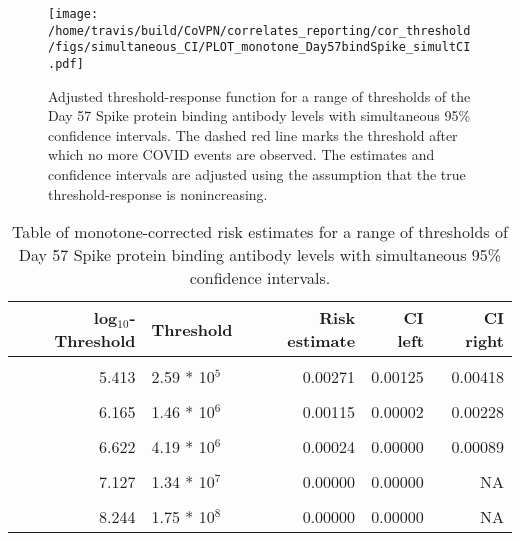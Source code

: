 \documentclass[]{book}
\theoremstyle{definition}
\theoremstyle{definition}
\theoremstyle{definition}
\newcommand{\1}{\mathbbm{1}}
\begin{document}
\begin{figure}[H]
\centering
\texttt{[image: /home/travis/build/CoVPN/correlates\_reporting/cor\_threshold/figs/simultaneous\_CI/PLOT\_monotone\_Day57bindSpike\_simultCI.pdf]}
\caption{Adjusted threshold-response function for a range of thresholds of the
  Day 57 Spike protein binding antibody levels with simultaneous 95\% confidence intervals. The dashed red line marks the threshold after which no more COVID events are observed. The estimates and confidence intervals are adjusted using the assumption that the true threshold-response is nonincreasing.}
\end{figure}
\begin{table}[!h]

\caption{\label{tab:unnamed-chunk-395}Table of monotone-corrected risk estimates for a range of thresholds of Day 57 Spike protein binding antibody levels with simultaneous 95\% confidence intervals.}
\centering
\begin{tabular}[t]{rlrrr}
\toprule
log$_{10}$-Threshold & Threshold & Risk estimate & CI left & CI right\\
\midrule
\cellcolor{gray!6}{4.536} & \cellcolor{gray!6}{3.44 * 10$^4$} & \cellcolor{gray!6}{0.00480} & \cellcolor{gray!6}{0.00289} & \cellcolor{gray!6}{0.00671}\\
5.413 & 2.59 * 10$^5$ & 0.00271 & 0.00125 & 0.00418\\
\cellcolor{gray!6}{5.797} & \cellcolor{gray!6}{6.27 * 10$^5$} & \cellcolor{gray!6}{0.00172} & \cellcolor{gray!6}{0.00049} & \cellcolor{gray!6}{0.00296}\\
6.165 & 1.46 * 10$^6$ & 0.00115 & 0.00002 & 0.00228\\
\cellcolor{gray!6}{6.405} & \cellcolor{gray!6}{2.54 * 10$^6$} & \cellcolor{gray!6}{0.00083} & \cellcolor{gray!6}{0.00000} & \cellcolor{gray!6}{0.00189}\\
6.622 & 4.19 * 10$^6$ & 0.00024 & 0.00000 & 0.00089\\
\cellcolor{gray!6}{6.820} & \cellcolor{gray!6}{6.61 * 10$^6$} & \cellcolor{gray!6}{0.00024} & \cellcolor{gray!6}{0.00000} & \cellcolor{gray!6}{0.00112}\\
7.127 & 1.34 * 10$^7$ & 0.00000 & 0.00000 & NA\\
\cellcolor{gray!6}{7.409} & \cellcolor{gray!6}{2.56 * 10$^7$} & \cellcolor{gray!6}{0.00000} & \cellcolor{gray!6}{0.00000} & \cellcolor{gray!6}{NA}\\
8.244 & 1.75 * 10$^8$ & 0.00000 & 0.00000 & NA\\
\bottomrule
\end{tabular}
\end{table}
\end{document}
